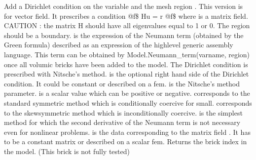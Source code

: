 \documentclass[a4paper,11pt,english]{sphinxmanual}
\begin{document}
\begin{fulllineitems}
\begin{fulllineitems}
\label{\detokenize{python/cmdref_Model:getfem.Model.add_generalized_Dirichlet_condition_with_Nitsche_method}}
Add a Dirichlet condition on the variable  and the mesh
region .
This version is for vector field. It prescribes a condition
@f\$ Hu = r @f\$ where  is a matrix field.
CAUTION : the matrix H should have all eigenvalues equal to 1 or 0.
The region should be a boundary.   
is the expression of the Neumann term (obtained by the Green formula)
described as an expression of the high\sphinxhyphen{}level
generic assembly language. This term can be obtained by 
Model.Neumann\_term(varname, region) once all volumic bricks have
been added to the model.  The Dirichlet
condition is prescribed with Nitsche’s method.  is the optional
right hand side of the Dirichlet condition. It could be constant or
described on a fem.  is the
Nitsche’s method parameter.  is a scalar value which can be
positive or negative.  corresponds to the standard symmetric
method which is conditionally coercive for   small.
 corresponds to the skew\sphinxhyphen{}symmetric method which is
inconditionally coercive.  is the simplest method
for which the second derivative of the Neumann term is not necessary
even for nonlinear problems.  is the data
corresponding to the matrix field . It has to be a constant matrix
or described on a scalar fem. Returns the brick index in the model.
(This brick is not fully tested)

\end{fulllineitems}



\end{fulllineitems}
\end{document}
